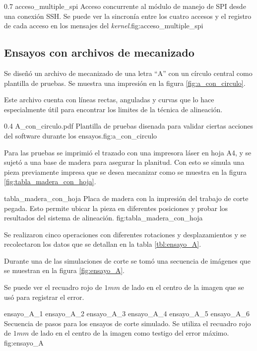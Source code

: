 \subfiga
{0.7} {acceso_multiple_spi} {Acceso concurrente al módulo de manejo de SPI desde una conexión SSH. Se puede ver la sincronía entre los cuatro accesos y el registro de cada acceso en los mensajes del \textit{kernel}.}{fig:acceso_multiple_spi}


\subsection{Ensayos con archivos de mecanizado}

Se diseñó un archivo de mecanizado de una letra ``A'' con un círculo central como plantilla de pruebas. Se muestra una impresión en la figura \ref{fig:a_con_circulo}.\par

Este archivo cuenta con líneas rectas, anguladas y curvas que lo hace especialmente útil para encontrar los limites de la técnica de alineación. \par
\subfiga
{0.4} {A_con_circulo.pdf} {Plantilla de pruebas disenada para validar ciertas acciones del software durante los ensayos.}{fig:a_con_circulo}

Para las pruebas se imprimió el trazado con una impresora láser en hoja A4, y se sujetó a una base de madera para asegurar la planitud. Con esto se simula una pieza previamente impresa que se desea mecanizar como se muestra en la figura \ref{fig:tabla_madera_con_hoja}.\par

    {tabla_madera_con_hoja} {Placa de madera con la impresión del trabajo de corte pegada. Esto permite ubicar la pieza en diferentes posiciones y probar los resultados del sistema de alineación.} {fig:tabla_madera_con_hoja}

   Se realizaron cinco operaciones con diferentes rotaciones y desplazamientos y se recolectaron los datos que se detallan en la tabla \ref{tbl:ensayo_A}.\par
   Durante una de las simulaciones de corte se tomó una secuencia de imágenes que se muestran en la figura \ref{fig:ensayo_A}.\par
   Se puede ver el recuadro rojo de $1 mm$ de lado en el centro de la imagen que se usó para registrar el error.\par

   \subfigthreethree
      {ensayo_A_1}
      {ensayo_A_2}
      {ensayo_A_3}
      {ensayo_A_4}
      {ensayo_A_5}
      {ensayo_A_6}
      {Secuencia de pasos para los ensayos de corte simulado. Se utiliza el recuadro rojo de $1 mm$ de lado en el centro de la imagen como testigo del error máximo.}
      {fig:ensayo_A}

